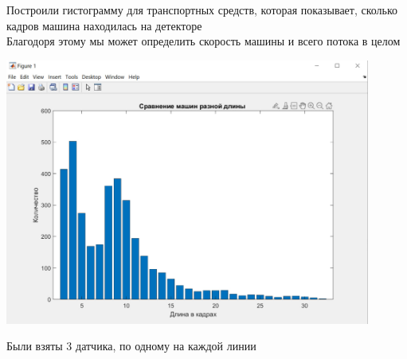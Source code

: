 \documentclass[a4paper,12pt]{article}
\begin{document}
Построили гистограмму для транспортных средств, которая показывает, сколько кадров машина находилась на детекторе\\
Благодоря этому мы может определить скорость машины и всего потока в целом
\begin{center}
\includegraphics[width=0.9\textwidth]{images/histogram.jpg}
\end{center}
\begin{center}
Были взяты 3 датчика, по одному на каждой линии
\end{center}

\newpage
\end{document}
